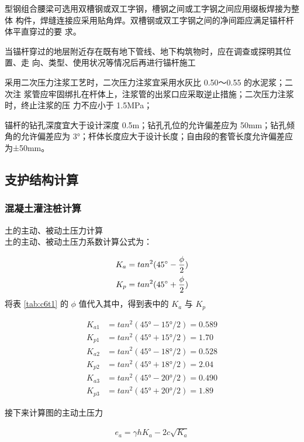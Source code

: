  型钢组合腰梁可选用双槽钢或双工字钢，槽钢之间或工字钢之间应用缀板焊接为整体
构件，焊缝连接应采用贴角焊。双槽钢或双工字钢之间的净间距应满足锚杆杆体平直穿过的要
求。

 当锚杆穿过的地层附近存在既有地下管线、地下构筑物时，应在调查或探明其位置、走
向、类型、使用状况等情况后再进行锚杆施工

 采用二次压力注浆工艺时，二次压力注浆宜采用水灰比 0.50～0.55 的水泥浆；二次注
浆管应牢固绑扎在杆体上，注浆管的出浆口应采取逆止措施；二次压力注浆时，终止注浆的压
力不应小于 1.5MPa；

 锚杆的钻孔深度宜大于设计深度 0.5m；钻孔孔位的允许偏差应为 50mm；钻孔倾角的允许偏差应为 3°；杆体长度应大于设计长度；自由段的套管长度允许偏差应为±50mm。 

\subsection{支护结构计算}
\subsubsection{混凝土灌注桩计算}

土的主动、被动土压力计算\\

土的主动、被动土压力系数计算公式为：

\begin{align}
    \label{fx:6.0}
    K_a&=tan^2(45^{\circ} -\frac{\phi }{2})\\
    \label{fx:6.0A}
    K_p&=tan^2(45^{\circ} +\frac{\phi }{2})
\end{align}
将表 \ref{tab:c6t1} 的 $\phi$ 值代入其中，得到表中的 $K_a$ 与 $K_p$

\begin{align*}
K_{a1}&=tan^2(45°-15°/2 )=0.589\\
K_{p1}&=tan^2(45°+15°/2 )=1.70 \\
K_{a2}&=tan^2(45°-18°/2 )=0.528 \\
K_{p2}&=tan^2(45°+18°/2 )=2.04\\
K_{a3}&=tan^2(45°-20°/2 )=0.490 \\
K_{p3}&=tan^2(45°+20°/2 )=1.89
\end{align*}

接下来计算图的主动土压力

\begin{align}
    \label{fx:6.1}
    e_a=\gamma hK_a-2c\sqrt{K_a}
\end{align}


